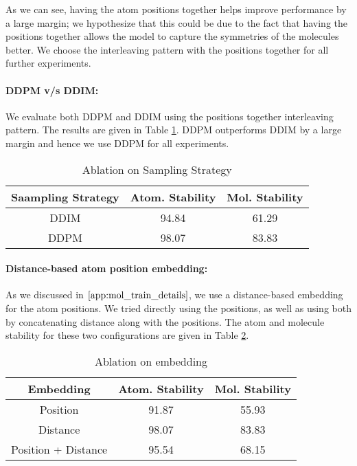 As we can see, having the atom positions together helps improve performance by a large margin; we hypothesize that this could be due to the fact that having the positions together allows the model to capture the symmetries of the molecules better. We choose the interleaving pattern with the positions together for all further experiments.

\paragraph{DDPM v/s DDIM:}
\label{app:par:ddpm_ddim}
We evaluate both DDPM and DDIM using the positions together interleaving pattern. The results are given in Table \ref{tab:abl_qm9_sampling}. DDPM outperforms DDIM by a large margin and hence we use DDPM for all experiments.

\begin{table}[h]
    \centering
    \begin{tabular}{c c c}
    \toprule
   Saampling Strategy& Atom. Stability & Mol. Stability \\
   \midrule
   DDIM  &  94.84 & 61.29 \\
   DDPM  & 98.07 & 83.83 \\
   \bottomrule
\end{tabular}
    \caption{Ablation on Sampling Strategy}
    \label{tab:abl_qm9_sampling}
\end{table}

\paragraph{Distance-based atom position embedding:} 
As we discussed in $\ref{app:mol_train_details}$, we use a distance-based embedding for the atom positions. We tried directly using the positions, as well as using both by concatenating distance along with the positions.  The atom and molecule stability for these two configurations are given in Table \ref{tab:abl_qm9_embedding}.
\begin{table}[h]
    \centering
    \begin{tabular}{c c c}
    \toprule
   Embedding & Atom. Stability & Mol. Stability \\
   \midrule
   Position  &  91.87 & 55.93 \\
   Distance  & 98.07 & 83.83 \\
   Position + Distance & 95.54 & 68.15 \\
   \bottomrule
\end{tabular}
    \caption{Ablation on embedding}
    \label{tab:abl_qm9_embedding}
\end{table}

